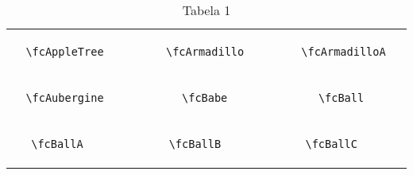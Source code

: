 \documentclass[x11names]{article}
\begin{document}
\begin{table}[H]
\begin{tabular}{|c|c|c|c|c|c|}
		&\multirow{5}{*}{	\fcAppleTree	[scale=0.4]} & &\multirow{5}{*}{	\fcArmadillo	[scale=0.3]} & &\multirow{5}{*}{	\fcArmadilloA	[scale=0.3]}\\	& & & & & \\	& & & & & \\	\verb|	\fcAppleTree	| & & \verb|	\fcArmadillo	| & & \verb|	\fcArmadilloA	| & \\	& & & & & \\	& & & & & \\	& & & & & \\	\hline									
		&\multirow{5}{*}{	\fcAubergine	[scale=0.4]} & &\multirow{5}{*}{	\fcBabe	[scale=0.4]} & &\multirow{5}{*}{	\fcBall	[scale=0.8]}\\	& & & & & \\	& & & & & \\	\verb|	\fcAubergine	| & & \verb|	\fcBabe	| & & \verb|	\fcBall	| & \\	& & & & & \\	& & & & & \\	& & & & & \\	\hline									
		&\multirow{5}{*}{	\fcBallA	[scale=0.4]} & &\multirow{5}{*}{	\fcBallB	[scale=0.4]} & &\multirow{5}{*}{	\fcBallC	[scale=0.4]}\\	& & & & & \\	& & & & & \\	\verb|	\fcBallA	| & & \verb|	\fcBallB	| & & \verb|	\fcBallC	| & \\	& & & & & \\	& & & & & \\	& & & & & \\		\hline 	\hline 	\end{tabular}	\caption{	Tabela 1	}\label{Tab1}\end{table}
\end{document}
